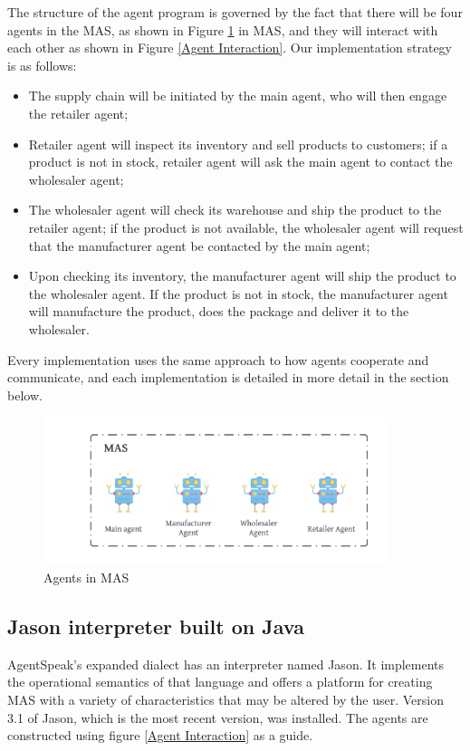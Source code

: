 The structure of the agent program is governed by the fact that there will be four agents in the MAS, as shown in Figure \ref{Agents in MAS} in MAS, and they will interact with each other as shown in Figure \ref{Agent Interaction}. Our implementation strategy is as follows:

\begin{itemize}
    \item The supply chain will be initiated by the main agent, who will then engage the retailer agent;
    \item Retailer agent will inspect its inventory and sell products to customers; if a product is not in stock, retailer agent will ask the main agent to contact the wholesaler agent;
    \item The wholesaler agent will check its warehouse and ship the product to the retailer agent; if the product is not available, the wholesaler agent will request that the manufacturer agent be contacted by the main agent;
    \item Upon checking its inventory, the manufacturer agent will ship the product to the wholesaler agent. If the product is not in stock, the manufacturer agent will manufacture the product, does the package and deliver it to the wholesaler.
\end{itemize}

Every implementation uses the same approach to how agents cooperate and communicate, and each implementation is detailed in more detail in the section below.

\begin{figure}[h]
\centering
  \includegraphics[width=10cm]{includes/figures/MAS.png} 
  \caption{Agents in \ac{MAS}}
  \label{Agents in MAS}
\end{figure}

\subsection{Jason interpreter built on Java}

AgentSpeak's expanded dialect has an interpreter named Jason. It implements the operational semantics of that language and offers a platform for creating \ac{MAS} with a variety of characteristics that may be altered by the user. Version 3.1 of Jason, which is the most recent version, was installed. The agents are constructed using figure  \ref{Agent Interaction} as a guide.

